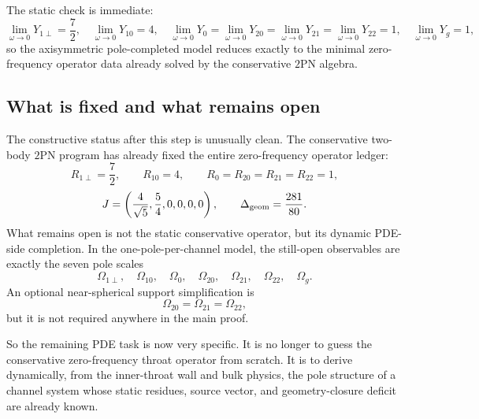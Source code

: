 \documentclass[11pt]{article}
\newcommand{\TwoPN}{\mathrm{2PN}}
\begin{document}
The static check is immediate:
\begin{equation}
\lim_{\omega\to 0}Y_{1\perp}=\frac72,
\quad
\lim_{\omega\to 0}Y_{10}=4,
\quad
\lim_{\omega\to 0}Y_0=
\lim_{\omega\to 0}Y_{20}=
\lim_{\omega\to 0}Y_{21}=
\lim_{\omega\to 0}Y_{22}=1,
\quad
\lim_{\omega\to 0}Y_g=1,
\label{eq:irred-dtn-static-limits}
\end{equation}
so the axisymmetric pole-completed model reduces exactly to the minimal
zero-frequency operator data already solved by the conservative \(\TwoPN\) algebra.

\subsection{What is fixed and what remains open}
\label{app:irred-dtn-status}

The constructive status after this step is unusually clean.
The conservative two-body \(\TwoPN\) program has already fixed the entire
zero-frequency operator ledger:
\begin{equation}
R_{1\perp}=\frac72,
\qquad
R_{10}=4,
\qquad
R_0=R_{20}=R_{21}=R_{22}=1,
\label{eq:irred-dtn-fixed-static}
\end{equation}
\begin{equation}
J=\left(\frac{4}{\sqrt5},\frac54,0,0,0,0\right),
\qquad
\Delta_{\rm geom}=\frac{281}{80}.
\label{eq:irred-dtn-fixed-Jdelta}
\end{equation}
What remains open is not the static conservative operator, but its dynamic PDE-side
completion.  In the one-pole-per-channel model, the still-open observables are exactly the
seven pole scales
\begin{equation}
\Omega_{1\perp},\quad
\Omega_{10},\quad
\Omega_0,\quad
\Omega_{20},\quad
\Omega_{21},\quad
\Omega_{22},\quad
\Omega_g.
\label{eq:irred-dtn-open-omegas}
\end{equation}
An optional near-spherical support simplification is
\begin{equation}
\Omega_{20}=\Omega_{21}=\Omega_{22},
\label{eq:irred-dtn-nearspherical}
\end{equation}
but it is not required anywhere in the main proof.

So the remaining PDE task is now very specific.
It is no longer to guess the conservative zero-frequency throat operator from scratch.
It is to derive dynamically, from the inner-throat wall and bulk physics, the pole
structure of a channel system whose static residues, source vector, and geometry-closure
deficit are already known.
\end{document}
